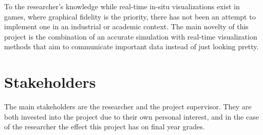 To the researcher's knowledge while real-time in-situ visualizations exist in games, where graphical fidelity is the priority, there has not been an attempt to implement one in an industrial or academic context.
The main novelty of this project is the combination of an accurate simulation with real-time visualization methods that aim to communicate important data instead of just looking pretty.


\section{Stakeholders}
The main stakeholders are the researcher and the project supervisor.
They are both invested into the project due to their own personal interest, and in the case of the researcher the effect this project has on final year grades.

